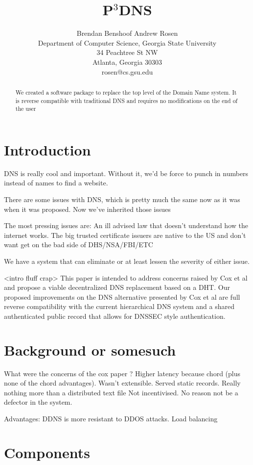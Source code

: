 \documentclass[11pt]{ieeetran} %
\title{P$^{3}$DNS}
\author{
Brendan Benshoof \qquad Andrew Rosen  \\Department of Computer Science, Georgia State University\\ 34 Peachtree St NW \\ Atlanta, Georgia 30303\\  rosen@cs.gsu.edu }
\begin{document}
\maketitle

\begin{abstract}
We created a software package to replace the top level of the Domain Name system.  It is reverse compatible with traditional DNS and requires no modifications on the end of the user
\end{abstract}


\section{Introduction}

DNS is really cool and important.  Without it, we'd be force to punch in numbers instead of names to find a website.    

There are some issues with DNS, which is pretty much the same now as it was when it was proposed.  Now we've inherited those issues

The most pressing issues are:
An ill advised law that doesn't understand how the internet works.
The big trusted certificate issuers are native to the US and don't want get on the bad side of DHS/NSA/FBI/ETC

We have a system that can eliminate or at least lessen the severity of either issue.

<intro fluff crap>
This paper is intended to address concerns raised by Cox et al\cite{cox} and propose a viable decentralized DNS replacement based on a DHT. Our proposed improvements on the DNS alternative presented by Cox et al are full reverse compatibility with the current hierarchical DNS system and a shared authenticated public record that allows for DNSSEC style authentication.

\section{Background or somesuch}
What were the concerns of the cox paper \cite{cox}?  
Higher latency because chord (plus none of the chord advantages). 
Wasn't extensible.  Served static records.  Really nothing more than a distributed text file
Not incentivised. No reason not be a defector in the system.

Advantages:  DDNS is more resistant to DDOS attacks.  Load balancing 


\section{Components}
\end{document}
